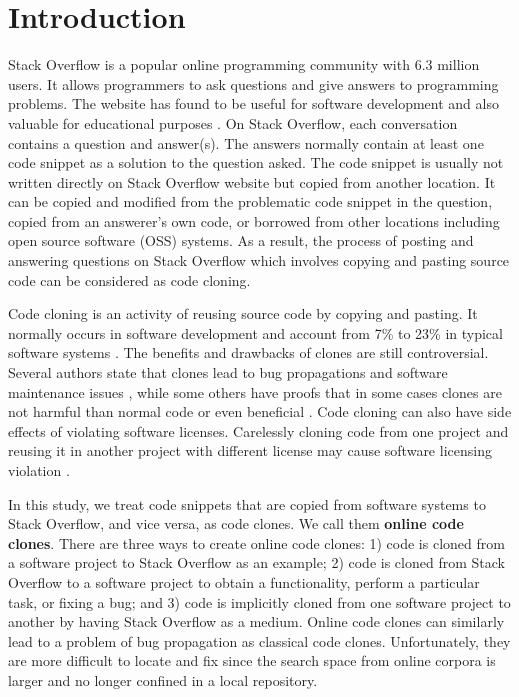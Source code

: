 \documentclass{sig-alternate-05-2015}
\begin{document}
\section{Introduction}
Stack Overflow is a popular online programming community with 6.3 million users. It allows programmers to ask questions and give answers to programming problems. The website has found to be useful for software development and also valuable for educational purposes \cite{x}. On Stack Overflow, each conversation contains a question and answer(s).  The answers normally contain at least one code snippet as a solution to the question asked. The code snippet is usually not written directly on Stack Overflow website but copied from another location. It can be copied and modified from the problematic code snippet in the question, copied from an answerer's own code, or borrowed from other locations including open source software (OSS) systems. As a result, the process of posting and answering questions on Stack Overflow which involves copying and pasting source code can be considered as code cloning. 

Code cloning is an activity of reusing source code by copying and pasting. It normally occurs in software development and account from 7\% to 23\% in typical software systems \cite{Bellon2007}. The benefits and drawbacks of clones are still controversial. Several authors state that clones lead to bug propagations and software maintenance issues \cite{Kamiya2002}, while some others have proofs that in some cases clones are not harmful than normal code or even beneficial \cite{Saini2016,Kapser2006}. Code cloning can also have side effects of violating software licenses. Carelessly cloning code from one project and reusing it in another project with different license may cause software licensing violation \cite{German2009}.

In this study, we treat code snippets that are copied from software systems to Stack Overflow, and vice versa, as code clones. We call them \textbf{online code clones}. There are three ways to create online code clones: 1) code is cloned from a software project to Stack Overflow as an example; 2) code is cloned from Stack Overflow to a software project to obtain a functionality, perform a particular task, or fixing a bug; and 3) code is implicitly cloned from one software project to another by having Stack Overflow as a medium. Online code clones can similarly lead to a problem of bug propagation as classical code clones. Unfortunately, they are more difficult to locate and fix since the search space from online corpora is larger and no longer confined in a local repository.
\end{document}
